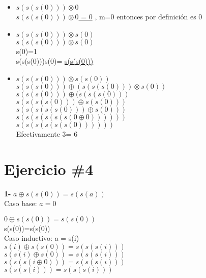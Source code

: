\documentclass{article}
\begin{document}
\begin{itemize}

        \item{$s(s(s(0)))\otimes 0$\\\medskip
        \underline{$s(s(s(0)))\otimes 0$ = 0} , m=0 entonces por definición es 0 }
        
        
        \item{$s(s(s(0)))\otimes s(0)$\\\medskip
        $s(s(s(0)))\otimes s(0)$\\\medskip
        s(0)=1 \\\medskip 
        s(s(s(0)))\otimes s(0)= \underline{s(s(s(0)))}}

        \item{$s(s(s(0)))\otimes s(s(0))$\\\medskip
        $s(s(s(0)))\oplus(s(s(s(0)))\otimes s(0))$\\\medskip
        $s(s(s(0)))\oplus(s(s(s(0)))$\\\medskip
        $s(s(s(s(0)))\oplus s(s(0)))$\\\medskip
        $s(s(s(s(s(0)))\oplus s(0)))$\\\medskip
        $s(s(s(s(s(s(0 \oplus 0))))))$\\\medskip
        \underline{$s(s(s(s(s(s(0))))))$} }\\\medskip
        Efectivamente 3= 6 \bigskip
        
    
\end{itemize}



\section{Ejercicio \#4}


\textbf{1-} {$a\oplus s(s(0))=s(s(a))$}\\
Caso base: $a=0$ \medskip

{$0\oplus s(s(0))=s(s(0))$}\\\medskip
{s(s(0))=s(s(0))}\\\medskip
Caso inductivo: a = s(i)\\\medskip
{$s(i) \oplus s(s(0))=s(s(s(i)))$}\\\medskip
{$s(s(i) \oplus s(0))=s(s(s(i)))$}\\\medskip
{$s(s(s(i \oplus 0)))=s(s(s(i)))$}\\  \medskip
\underline{$s(s(s(i)))=s(s(s(i)))$}\\\medskip
\end{document}
